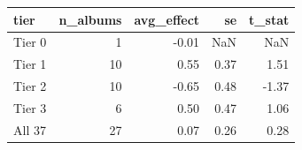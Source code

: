 \begin{tabular}{lrrrr}
\toprule
tier & n\_albums & avg\_effect & se & t\_stat \\
\midrule
Tier 0 & 1 & -0.01 & NaN & NaN \\
Tier 1 & 10 & 0.55 & 0.37 & 1.51 \\
Tier 2 & 10 & -0.65 & 0.48 & -1.37 \\
Tier 3 & 6 & 0.50 & 0.47 & 1.06 \\
All 37 & 27 & 0.07 & 0.26 & 0.28 \\
\bottomrule
\end{tabular}
